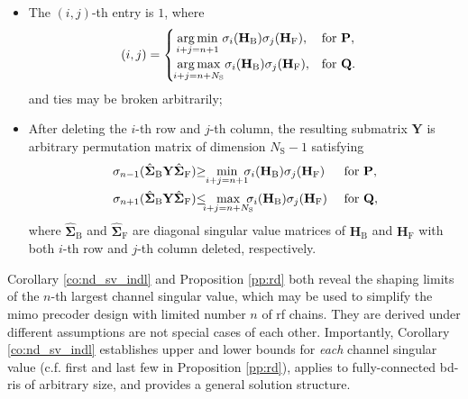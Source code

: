 \documentclass[
	fontsize=11pt,
	paper=a4,
	foldmarks=false
]{scrartcl}
\begin{document}
\begin{reviewer}
{{\begin{corollary}
				\begin{itemize}
					\item The $(i, j)$-th entry is $1$, where
					\begin{align*}
						(i, j) &=
						\begin{cases}
							\underset{\mathclap{i+j=n+1}}{\arg\min} \ \sigma_i(\mathbf{H}_\mathrm{B}) \sigma_j(\mathbf{H}_\mathrm{F}), & \text{for } \mathbf{P}, \\
							\underset{\mathclap{i+j=n+N_\mathrm{S}}}{\arg\max} \ \sigma_i(\mathbf{H}_\mathrm{B}) \sigma_j(\mathbf{H}_\mathrm{F}), & \text{for } \mathbf{Q}.
						\end{cases}
					\end{align*}
					and ties may be broken arbitrarily;
					\item After deleting the $i$-th row and $j$-th column, the resulting submatrix $\mathbf{Y}$ is arbitrary permutation matrix of dimension $N_\mathrm{S}-1$ satisfying
					\begin{alignat*}{2}
						\sigma_{n{-}1}(\hat{\mathbf{\Sigma}}_{\mathrm{B}} \mathbf{Y} \hat{\mathbf{\Sigma}}_{\mathrm{F}}) & {\ge} \ \ \min_{\mathclap{i+j=n+1}} \ \sigma_i(\mathbf{H}_\mathrm{B}) \sigma_j(\mathbf{H}_\mathrm{F})            &  & \text{ for } \mathbf{P}, \\
						\sigma_{n{+}1}(\hat{\mathbf{\Sigma}}_{\mathrm{B}} \mathbf{Y} \hat{\mathbf{\Sigma}}_{\mathrm{F}}) & {\le} \ \ \max_{\mathclap{i+j=n+N_\mathrm{S}}} \ \sigma_i(\mathbf{H}_\mathrm{B}) \sigma_j(\mathbf{H}_\mathrm{F}) &  & \text{ for } \mathbf{Q},
					\end{alignat*}
					where $\hat{\mathbf{\Sigma}}_{\mathrm{B}}$ and $\hat{\mathbf{\Sigma}}_{\mathrm{F}}$ are diagonal singular value matrices of $\mathbf{H}_\mathrm{B}$ and $\mathbf{H}_\mathrm{F}$ with both $i$-th row and $j$-th column deleted, respectively.
				\end{itemize}
			\end{corollary}
			Corollary \ref{co:nd_sv_indl} and Proposition \ref{pp:rd} both reveal the shaping limits of the $n$-th largest channel singular value, which may be used to simplify the \gls{mimo} precoder design with limited number $n$ of \gls{rf} chains.
			They are derived under different assumptions are not special cases of each other.
			Importantly, Corollary \ref{co:nd_sv_indl} establishes upper and lower bounds for \emph{each} channel singular value (c.f. first and last few in Proposition \ref{pp:rd}), applies to fully-connected \gls{bd}-\gls{ris} of arbitrary size, and provides a general solution structure.
		}

}
\end{reviewer}
\end{document}
